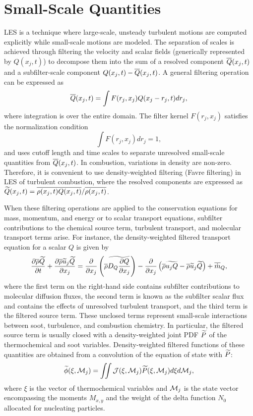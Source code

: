 \section{Small-Scale Quantities}
\label{sec:lesmodels:presumedpdf}

LES is a technique where large-scale, unsteady turbulent motions are computed explicitly while small-scale motions are modeled. The separation of scales is achieved through filtering the velocity and scalar fields (generically represented by $Q(x_j,t)$) to decompose them into the sum of a resolved component $\mean{Q}(x_j,t)$ and a subfilter-scale component $Q(x_j,t)-\mean{Q}(x_j,t)$. A general filtering operation can be expressed as
\begin{equation}\label{eq:lesmodels:presumedpdf:filter}
  \mean{Q}(x_j,t) = \int F(r_j,x_j)Q(x_j - r_j, t)dr_j,
\end{equation}
where integration is over the entire domain. The filter kernel $F(r_j,x_j)$ satisfies the normalization condition
\begin{equation}\label{eq:lesmodels:presumedpdf:kernel}
  \int F(r_j,x_j)dr_j = 1,
\end{equation}
and uses cutoff length and time scales to separate unresolved small-scale quantities from $\mean{Q}(x_j,t)$. In combustion, variations in density are non-zero. Therefore, it is convenient to use density-weighted filtering (Favre filtering) in LES of turbulent combustion, where the resolved components are expressed as $\tf{Q}(x_j,t) = \mean{\rho(x_j,t)Q(x_j,t)}/\mean{\rho(x_j,t)}$.

When these filtering operations are applied to the conservation equations for mass, momentum, and energy or to scalar transport equations, subfilter contributions to the chemical source term, turbulent transport, and molecular transport terms arise. For instance, the density-weighted filtered transport equation for a scalar $Q$ is given by
\begin{equation}\label{eq:lesmodels:presumedpdf:scalar}
  \ftrder{\tf{Q}} = \pder[]{x_j}\left( \mean{\rho}\tf{D_Q\pder[Q]{x_j}} \right) - \dsff[\tf{Q}]{\tf{u_j Q}} + \fst[m]{Q},
\end{equation}
where the first term on the right-hand side contains subfilter contributions to molecular diffusion fluxes, the second term is known as the subfilter scalar flux and contains the effects of unresolved turbulent transport, and the third term is the filtered source term. These unclosed terms represent small-scale interactions between soot, turbulence, and combustion chemistry. In particular, the filtered source term is usually closed with a density-weighted joint PDF $\tf{P}$ of the thermochemical and soot variables. Density-weighted filtered functions of these quantities are obtained from a convolution of the equation of state with $\tf{P}$:
\begin{equation}\label{eq:lesmodels:presumedpdf:filteredfuncs}
  \tf{\phi}(\xi,\mc{M}_j) = \iint \mc{J}(\xi,\mc{M}_j)\tf{P}(\xi,\mc{M}_j) d\xi d\mc{M}_j,
\end{equation}
where $\xi$ is the vector of thermochemical variables and $\mc{M}_j$ is the state vector encompassing the moments $M_{x,y}$ and the weight of the delta function $N_0$ allocated for nucleating particles.

